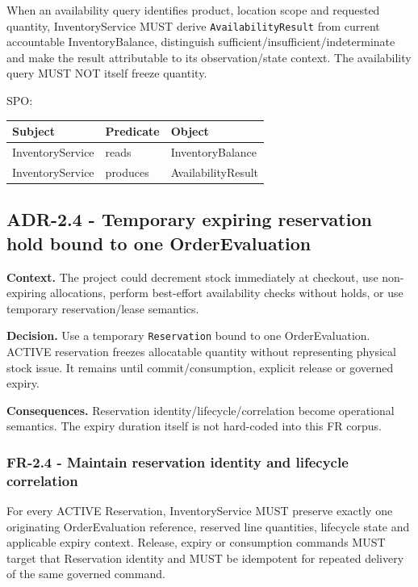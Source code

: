 \documentclass[
  10pt,
]{article}
\begin{document}
When an availability query identifies product, location scope and
requested quantity, InventoryService MUST derive
\texttt{AvailabilityResult} from current accountable InventoryBalance,
distinguish sufficient/insufficient/indeterminate and make the result
attributable to its observation/state context. The availability query
MUST NOT itself freeze quantity.

SPO:

\begin{longtable}[]{@{}lll@{}}
\toprule\noalign{}
Subject & Predicate & Object \\
\midrule\noalign{}
\endhead
\bottomrule\noalign{}
\endlastfoot
InventoryService & reads & InventoryBalance \\
InventoryService & produces & AvailabilityResult \\
\end{longtable}

\subsection{ADR-2.4 - Temporary expiring reservation hold bound to one
OrderEvaluation}\label{adr-24---temporary-expiring-reservation-hold-bound-to-one-orderevaluation}

\textbf{Context.} The project could decrement stock immediately at
checkout, use non-expiring allocations, perform best-effort availability
checks without holds, or use temporary reservation/lease semantics.

\textbf{Decision.} Use a temporary \texttt{Reservation} bound to one
OrderEvaluation. ACTIVE reservation freezes allocatable quantity without
representing physical stock issue. It remains until commit/consumption,
explicit release or governed expiry.

\textbf{Consequences.} Reservation identity/lifecycle/correlation become
operational semantics. The expiry duration itself is not hard-coded into
this FR corpus.

\subsubsection{FR-2.4 - Maintain reservation identity and lifecycle
correlation}\label{fr-24---maintain-reservation-identity-and-lifecycle-correlation}

For every ACTIVE Reservation, InventoryService MUST preserve exactly one
originating OrderEvaluation reference, reserved line quantities,
lifecycle state and applicable expiry context. Release, expiry or
consumption commands MUST target that Reservation identity and MUST be
idempotent for repeated delivery of the same governed command.
\end{document}
